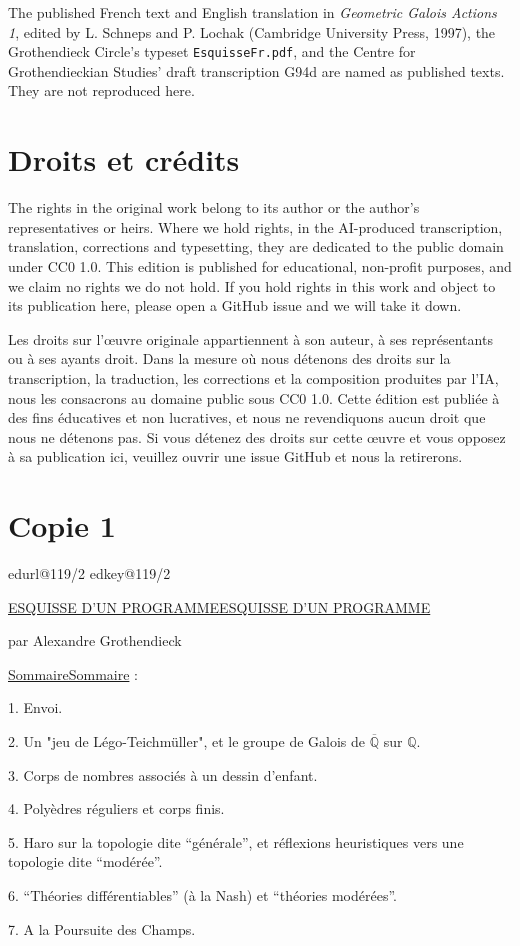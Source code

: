 \documentclass[11pt,a4paper]{article}
\makeatletter
\newif\ifreading
\def\CurrentScanURL{}
\def\CurrentPageKey{}
\def\CurrentCopy{copy1}
\def\CurrentApparatus{}
\newcommand{\EditionPart}[2]{\clearpage\def\CurrentCopy{#1}\section*{#2}}
\newcommand{\scanpage}[1]{%
  \clearpage
  \expandafter\let\expandafter\CurrentScanURL\csname edurl@#1\endcsname
  \expandafter\let\expandafter\CurrentPageKey\csname edkey@#1\endcsname
  \def\CurrentApparatus{}%
  \hypertarget{scan-\CurrentPageKey}{}%
  \typeout{EDITION-SCAN: \CurrentPageKey; PDFPAGE: \the\numexpr\ReadonlyShipoutCounter+1\relax}%
  \ifreading
    \marginnote{\raggedright\scriptsize\sffamily\href{\CurrentScanURL}{119 / \csname edpage@#1\endcsname}}%
  \else
    \noindent{\small\sffamily\href{\CurrentScanURL}{[scan #1]}}\par\smallskip
  \fi}
\let\TextUline\uline
\renewcommand{\uline}[1]{\ifmmode\underline{#1}\else\TextUline{#1}\fi}
\makeatother
\begin{document}
The published French text and English translation in \textit{Geometric Galois Actions 1}, edited by L. Schneps and P. Lochak (Cambridge University Press, 1997), the Grothendieck Circle's typeset \texttt{EsquisseFr.pdf}, and the Centre for Grothendieckian Studies' draft transcription G94d are named as published texts. They are not reproduced here.

\section*{Droits et crédits}
The rights in the original work belong to its author or the author's representatives or heirs. Where we hold rights, in the AI-produced transcription, translation, corrections and typesetting, they are dedicated to the public domain under CC0 1.0. This edition is published for educational, non-profit purposes, and we claim no rights we do not hold. If you hold rights in this work and object to its publication here, please open a GitHub issue and we will take it down.

Les droits sur l'œuvre originale appartiennent à son auteur, à ses représentants ou à ses ayants droit. Dans la mesure où nous détenons des droits sur la transcription, la traduction, les corrections et la composition produites par l'IA, nous les consacrons au domaine public sous CC0 1.0. Cette édition est publiée à des fins éducatives et non lucratives, et nous ne revendiquons aucun droit que nous ne détenons pas. Si vous détenez des droits sur cette œuvre et vous opposez à sa publication ici, veuillez ouvrir une issue GitHub et nous la retirerons.
\clearpage

\EditionPart{copy1}{Copie 1}
\scanpage{119/2}
\uline{ESQUISSE D'UN PROGRAMME}

par Alexandre Grothendieck

\uline{Sommaire} :

1. Envoi.

2. Un "jeu de Légo-Teichmüller", et le groupe de Galois de $\overline{\mathbb{Q}}$ sur $\mathbb{Q}$.

3. Corps de nombres associés à un dessin d'enfant.

4. Polyèdres réguliers et corps finis.

5. Haro sur la topologie dite ``générale'', et réflexions heuristiques
vers une topologie dite ``modérée''.

6. ``Théories différentiables'' (à la Nash) et ``théories modérées''.

7. A la Poursuite des Champs.
\end{document}
